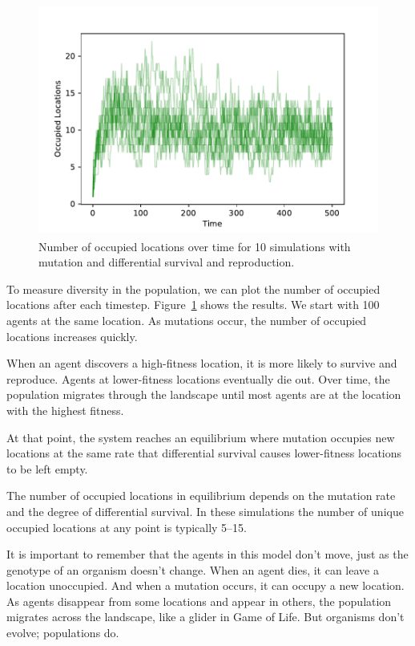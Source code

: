 \documentclass[12pt]{book}
\theoremstyle{exercise}
\begin{document}
\begin{figure}
\centerline{\includegraphics[height=3in]{figs/chap11-4.pdf}}
\caption{Number of occupied locations over time for 10 simulations with mutation and differential survival and reproduction.}
\label{chap11-4}
\end{figure}

To measure diversity in the population, we can plot the number of occupied locations after each timestep.  Figure~\ref{chap11-4} shows the results.  We start with 100 agents at the same location.  As mutations occur, the number of occupied locations increases quickly.

When an agent discovers a high-fitness location, it is more likely to survive and reproduce.  Agents at lower-fitness locations eventually die out.  Over time, the population migrates through the landscape until most agents are at the location with the highest fitness.


At that point, the system reaches an equilibrium where mutation occupies new locations at the same rate that differential survival causes lower-fitness locations to be left empty.

The number of occupied locations in equilibrium depends on the mutation rate and the degree of differential survival.  In these simulations the number of unique occupied locations at any point is typically 5--15.

It is important to remember that the agents in this model don't move, just as the genotype of an organism doesn't change.  When an agent dies, it can leave a location unoccupied.  And when a mutation occurs, it can occupy a new location.  As agents disappear from some locations and appear in others, the population migrates across the landscape, like a glider in Game of Life.  But organisms don't evolve; populations do.
\end{document}
